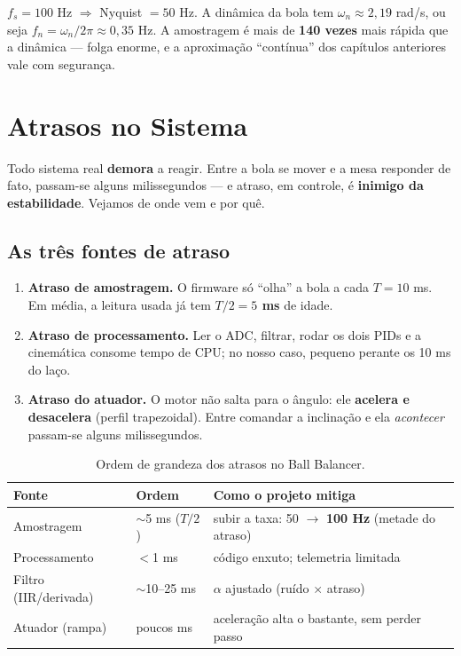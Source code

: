 \begin{exemplo}
$f_s=100$ Hz $\Rightarrow$ Nyquist $=50$ Hz. A din\^amica da bola tem
$\omega_n\approx2{,}19$ rad/s, ou seja $f_n=\omega_n/2\pi\approx0{,}35$ Hz.
A amostragem \'e mais de \textbf{140 vezes} mais r\'apida que a din\^amica --- folga
enorme, e a aproxima\c{c}\~ao ``cont\'inua'' dos cap\'itulos anteriores vale com
seguran\c{c}a.
\end{exemplo}

\chapter{Atrasos no Sistema}\label{cap:atrasos}

Todo sistema real \textbf{demora} a reagir. Entre a bola se mover e a mesa
responder de fato, passam-se alguns milissegundos --- e atraso, em controle, \'e
\textbf{inimigo da estabilidade}. Vejamos de onde vem e por qu\^e.

\section{As tr\^es fontes de atraso}
\begin{enumerate}[leftmargin=1.5em]
  \item \textbf{Atraso de amostragem.} O firmware s\'o ``olha'' a bola a cada
  $T=10$ ms. Em m\'edia, a leitura usada j\'a tem \textbf{$T/2=5$ ms} de idade.
  \item \textbf{Atraso de processamento.} Ler o ADC, filtrar, rodar os dois PIDs e a
  cinem\'atica consome tempo de CPU; no nosso caso, pequeno perante os 10 ms do la\c{c}o.
  \item \textbf{Atraso do atuador.} O motor n\~ao salta para o \^angulo: ele
  \textbf{acelera e desacelera} (perfil trapezoidal). Entre comandar a inclina\c{c}\~ao
  e ela \emph{acontecer} passam-se alguns milissegundos.
\end{enumerate}

\begin{table}[h]\centering
\caption{Ordem de grandeza dos atrasos no Ball Balancer.}
\label{tab:atrasos}
\small
\begin{tabularx}{\textwidth}{l l X}
\toprule
Fonte & Ordem & Como o projeto mitiga \\
\midrule
Amostragem & $\sim$5 ms ($T/2$) & subir a taxa: 50 $\to$ \textbf{100 Hz} (metade do atraso) \\
Processamento & $<$1 ms & c\'odigo enxuto; telemetria limitada \\
Filtro (IIR/derivada) & $\sim$10--25 ms & $\alpha$ ajustado (ru\'ido $\times$ atraso) \\
Atuador (rampa) & poucos ms & acelera\c{c}\~ao alta o bastante, sem perder passo \\
\bottomrule
\end{tabularx}
\end{table}

